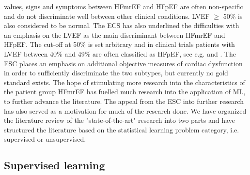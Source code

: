 \documentclass[../thesis.tex]{subfiles}
\begin{document}


\noindent values, signs and symptoms between HFmrEF and HFpEF are often non-specific and do not discriminate well between other clinical conditions. LVEF $\geq$ 50\% is also considered to be normal. The ECS has also underlined the difficulties with an emphasis on the LVEF as the main discriminant between HFmrEF and HFpEF. The cut-off at 50\% is set arbitrary and in clinical trials patients with LVEF between 40\% and 49\% are often classified as HFpEF, see e.g. \cite{kelly2015patient} and \cite{ponikowski2016}. The ESC places an emphasis on additional objective measures of cardiac dysfunction in order to sufficiently discriminate the two subtypes, but currently no gold standard exists. The hope of stimulating more research into the characteristics of the patient group HFmrEF has fuelled much research into the application of ML, to further advance the literature. The appeal from the ESC into further research has also served as a motivation for much of the research done.  We have organized the literature review of the "state-of-the-art" research into two parts and have structured the literature based on the statistical learning problem category, i.e. supervised or unsupervised.

\subsection{Supervised learning}
\label{subsec:supervisedlearn}
\end{document}
